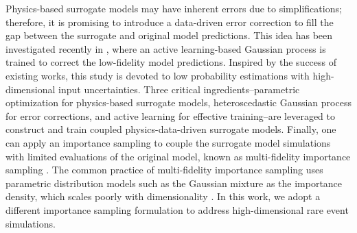 \documentclass[number,preprint,3p]{elsarticle}
\newcommand{\1}[2]{\mathbb{I}_{#1}\left(#2\right)}
\begin{document}
	Physics-based surrogate models may have inherent errors due to simplifications; therefore, it is promising to introduce a data-driven error correction to fill the gap between the surrogate and original model predictions. This idea has been investigated recently in \cite{dhulipala2022active,dhulipala2022reliability}, where an active learning-based Gaussian process is trained to correct the low-fidelity model predictions. Inspired by the success of existing works,
 this study is devoted to low probability estimations with high-dimensional input uncertainties. Three critical ingredients--parametric optimization for physics-based surrogate models, heteroscedastic Gaussian process for error corrections, and active learning for effective training--are leveraged to construct and train coupled physics-data-driven surrogate models. Finally, one can apply an importance sampling to couple the surrogate model simulations with limited evaluations of the original model, known as multi-fidelity importance sampling \cite{peherstorfer2016multifidelity,kramer2019multifidelity}. The common practice of multi-fidelity importance sampling uses parametric distribution models such as the Gaussian mixture as the importance density, which scales poorly with dimensionality \cite{wang2016cross}. In this work, we adopt a different importance sampling formulation  \cite{wang2022optimized} to address high-dimensional rare event simulations. 
 
	
\end{document}
